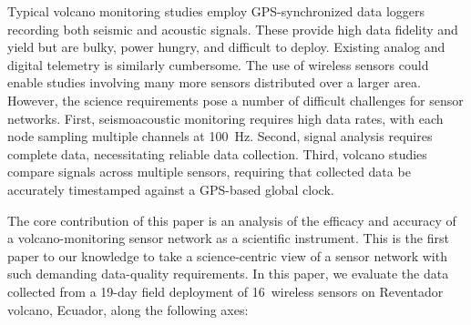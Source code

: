 
Typical volcano monitoring studies employ GPS-synchronized data loggers
recording both seismic and acoustic signals. These provide high data fidelity
and yield but are bulky, power hungry, and difficult to deploy. Existing
analog and digital telemetry is similarly cumbersome. 
The use of wireless sensors could enable studies involving many more sensors
distributed over a larger area. However, the science requirements pose a
number of difficult challenges for sensor networks.  First, seismoacoustic
monitoring requires high data rates, with each node sampling multiple
channels at 100~Hz. Second, signal analysis requires complete data,
necessitating reliable data collection. Third, volcano studies compare
signals across multiple sensors, requiring that collected data be accurately
timestamped against a GPS-based global clock.


The core contribution of this paper is an analysis of the efficacy and
accuracy of a volcano-monitoring sensor network as a scientific instrument.
This is the first paper to our knowledge to take a science-centric view of a
sensor network with such demanding data-quality requirements.  In this paper,
we evaluate the data collected from a 19-day field deployment of 16~wireless
sensors on Reventador volcano, Ecuador, along the following axes:

